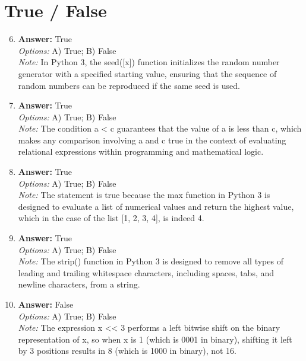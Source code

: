 \documentclass[12pt]{article}
\begin{document}
\section*{True / False}
\begin{enumerate}[label=\arabic*.]
\setcounter{enumi}{5}
\item \textbf{Answer:} True
\\ \textit{Options:} A) True; B) False
\\ \textit{Note:} In Python 3, the seed([x]) function initializes the random number generator with a specified starting value, ensuring that the sequence of random numbers can be reproduced if the same seed is used.
\item \textbf{Answer:} True
\\ \textit{Options:} A) True; B) False
\\ \textit{Note:} The condition a \textless{} c guarantees that the value of a is less than c, which makes any comparison involving a and c true in the context of evaluating relational expressions within programming and mathematical logic.
\item \textbf{Answer:} True
\\ \textit{Options:} A) True; B) False
\\ \textit{Note:} The statement is true because the max function in Python 3 is designed to evaluate a list of numerical values and return the highest value, which in the case of the list [1, 2, 3, 4], is indeed 4.
\item \textbf{Answer:} True
\\ \textit{Options:} A) True; B) False
\\ \textit{Note:} The strip() function in Python 3 is designed to remove all types of leading and trailing whitespace characters, including spaces, tabs, and newline characters, from a string.
\item \textbf{Answer:} False
\\ \textit{Options:} A) True; B) False
\\ \textit{Note:} The expression x \textless{}\textless{} 3 performs a left bitwise shift on the binary representation of x, so when x is 1 (which is 0001 in binary), shifting it left by 3 positions results in 8 (which is 1000 in binary), not 16.
\end{enumerate}
\end{document}
